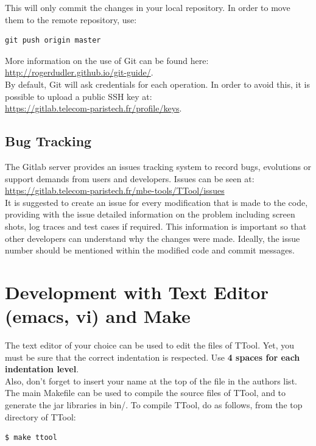 \documentclass[12pt]{article}
\begin{document}
This will only commit the changes in your local repository. In order to move them to the remote repository, use:

\begin{verbatim}
git push origin master
\end{verbatim}

More information on the use of Git can be found here: \\
\url{http://rogerdudler.github.io/git-guide/}. \\

By default, Git will ask credentials for each operation. In order to avoid this,
it is possible to upload a public SSH key at: \\
\url{https://gitlab.telecom-paristech.fr/profile/keys}.

\subsection{Bug Tracking}

The Gitlab server provides an issues tracking system to record bugs, evolutions
or support demands from users and developers. Issues can be seen at: \\
\url{https://gitlab.telecom-paristech.fr/mbe-tools/TTool/issues} \\

It is suggested to create an issue for every modification that is made to the
code, providing with the issue detailed information on the problem including
screen shots, log traces and test cases if required. This information is
important so that other developers can understand why the changes were made.
Ideally, the issue number should be mentioned within the modified code and
commit messages.  \\

\section{Development with Text Editor (emacs, vi) and Make}

The text editor of your choice can be used to edit the files of TTool. Yet, you must be sure that the correct indentation is respected. Use \textbf{4 spaces for each indentation level}.\\

Also, don't forget to insert your name at the top of the file in the authors list.\\

The main Makefile can be used to compile the source files of TTool, and to generate the jar libraries in bin/.
To compile TTool, do as follows, from the top directory of TTool:
\begin{verbatim}
$ make ttool
\end{verbatim}
\end{document}
